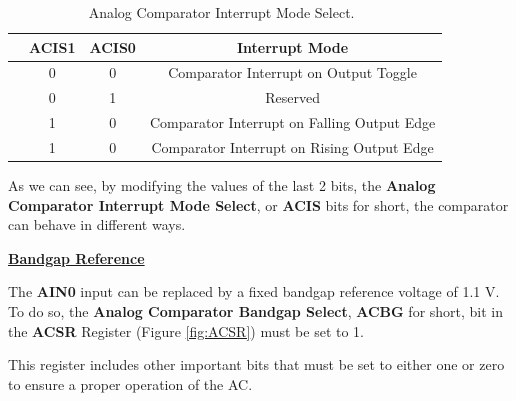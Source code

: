 \begin{table}[H]
        \centering
        \begin{tabular}[t]{lccc}
            \toprule
            & \textbf{ACIS1} & \textbf{ACIS0} & \textbf{Interrupt Mode}      \\
            \midrule
            & 0 & 0 & Comparator Interrupt on Output Toggle                  \\
            & 0 & 1 & Reserved                                               \\
            & 1 & 0 & Comparator Interrupt on Falling Output Edge            \\
            & 1 & 0 & Comparator Interrupt on Rising Output Edge             \\
            \bottomrule
        \end{tabular}
        \caption{Analog Comparator Interrupt Mode Select.~\autocite{ATMEGA328P}}
        \label{table:ACISn_COMP}
\end{table}

As we can see, by modifying the values of the last 2 bits, the \textbf{Analog Comparator Interrupt Mode Select}, or \textbf{ACIS} bits for short, the comparator can behave in different ways.

\clearpage

\medskip
\underline{\textbf{Bandgap Reference}}
\medskip

The \textbf{AIN0} input can be replaced by a fixed bandgap reference voltage of 1.1 V. To do so, the \textbf{Analog Comparator Bandgap Select}, \textbf{ACBG} for short, bit in the \textbf{ACSR} Register (Figure \ref{fig:ACSR}) must be set to 1.\medskip

This register includes other important bits that must be set to either one or zero to ensure a proper operation of the AC.

